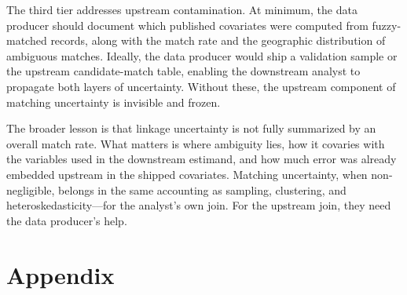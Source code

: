\documentclass[12pt]{article}
\theoremstyle{remark}
\begin{document}
The third tier addresses upstream contamination. At minimum, the data producer should document which published covariates were computed from fuzzy-matched records, along with the match rate and the geographic distribution of ambiguous matches. Ideally, the data producer would ship a validation sample or the upstream candidate-match table, enabling the downstream analyst to propagate both layers of uncertainty. Without these, the upstream component of matching uncertainty is invisible and frozen.

The broader lesson is that linkage uncertainty is not fully summarized by an overall match rate. What matters is where ambiguity lies, how it covaries with the variables used in the downstream estimand, and how much error was already embedded upstream in the shipped covariates. Matching uncertainty, when non-negligible, belongs in the same accounting as sampling, clustering, and heteroskedasticity---for the analyst's own join. For the upstream join, they need the data producer's help.

\clearpage



\clearpage
\appendix
\section*{Appendix}

\end{document}
